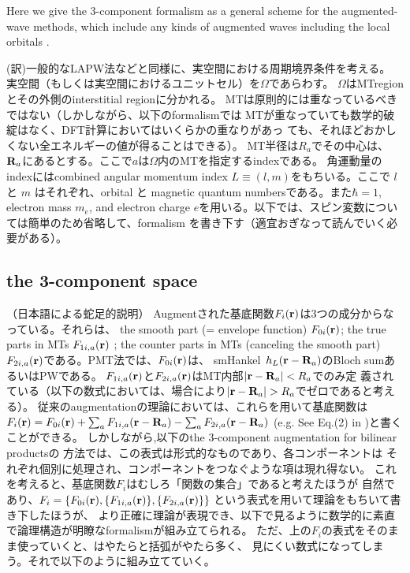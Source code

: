 \documentclass[a4paper,10pt,aip,onecolumn,amsmath,amssymb,floatfix,rmp]{revtex4-1}
\newcommand{\bfr}{{\bf r}}
\newcommand{\bfR}{{\bf R}}
\def\smh{smHankel}
\begin{document}
Here we give the 3-component formalism as a general
scheme for the augmented-wave methods, which include any kinds of
augmented waves including the local orbitals \cite{PhysRevB.43.6388}.

(訳)一般的なLAPW法などと同様に、実空間における周期境界条件を考える。
実空間（もしくは実空間におけるユニットセル）を$\Omega$であらわす。
$\Omega$はMTregionとその外側のinterstitial regionに分かれる。
MTは原則的には重なっているべきではない（しかしながら、以下のformalismでは
MTが重なっていても数学的破綻はなく、DFT計算においてはいくらかの重なりがあっ
ても、それほどおかしくない全エネルギーの値が得ることはできる）。
MT半径は$R_a$でその中心は、$\bfR_a$にあるとする。ここで$a$は$\Omega$内のMTを指定するindexである。
角運動量のindexにはcombined angular momentum index
$L\equiv(l,m)$をもちいる。ここで $l$ と $m$ はそれぞれ、orbital と magnetic quantum
numbersである。また$\hbar=1$, electron mass $m_e$, and electron charge
$e$を用いる。以下では、スピン変数については簡単のため省略して、formalism
を書き下す（適宜おぎなって読んでいく必要がある）。

\subsection{the 3-component space}
\label{sec:3compo}

（日本語による蛇足的説明）
Augmentされた基底関数$F_{i}(\bfr)$は3つの成分からなっている。それらは、
the smooth part (= envelope function) $F_{0i}(\bfr)$;
the true parts in MTs $F_{1i,a}(\bfr)$
; the counter parts in MTs (canceling the smooth part) 
$F_{2i,a}(\bfr)$である。PMT法では、$F_{0i}(\bfr)$は、
\smh\ $h_L(\bfr-\bfR_a)$のBloch sumあるいはPWである。
$F_{1i,a}(\bfr)$と$F_{2i,a}(\bfr)$はMT内部$|\bfr-\bfR_a|<R_a$でのみ定
義されている（以下の数式においては、場合により$|\bfr-\bfR_a|>R_a$でゼロであると考える）。
従来のaugmentationの理論においては、これらを用いて基底関数は
$F_i(\bfr) = F_{0i}(\bfr)+\sum_a F_{1i,a}(\bfr-\bfR_a)- \sum_a F_{2i,a}(\bfr-\bfR_a)$ 
(e.g. See Eq.(2) in \cite{kresse99})と書くことができる。
しかしながら,以下のthe 3-component augmentation for bilinear productsの
方法では、この表式は形式的なものであり、各コンポーネントは
それぞれ個別に処理され、コンポーネントをつなぐような項は現れ得ない。
これを考えると、基底関数$F_i$はむしろ「関数の集合」であると考えたほうが
自然であり、$F_i=\{F_{0i}(\bfr),\{F_{1i,a}(\bfr)\},\{F_{2i,a}(\bfr)\} \}$
という表式を用いて理論をもちいて書き下したほうが、
より正確に理論が表現でき、以下で見るように数学的に素直で論理構造が明瞭なformalismが組み立てられる。
ただ、上の$F_i$の表式をそのまま使っていくと、はやたらと括弧がやたら多く、
見にくい数式になってしまう。それで以下のように組み立てていく。\\
\end{document}
